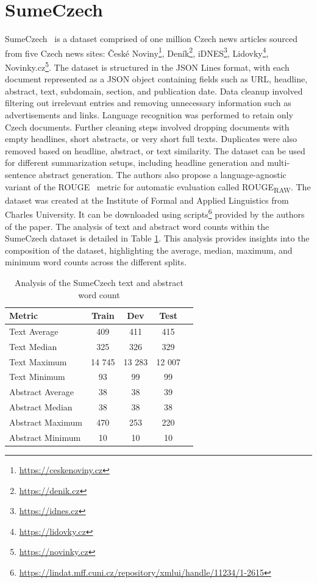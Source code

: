 \documentclass[english, ba, kiv, he, iso690numb, pdf, viewonly]{fasthesis}
\begin{document}
	\section{SumeCzech} \label{sumeczech-section}
	SumeCzech~\cite{straka-etal-2018-sumeczech} is a dataset comprised of one million Czech news articles sourced from five Czech news sites: České Noviny\footnote{\url{https://ceskenoviny.cz}}, Deník\footnote{\url{https://denik.cz}}, iDNES\footnote{\url{https://idnes.cz}}, Lidovky\footnote{\url{https://lidovky.cz}}, Novinky.cz\footnote{\url{https://novinky.cz}}. The dataset is structured in the JSON Lines format, with each document represented as a JSON object containing fields such as URL, headline, abstract, text, subdomain, section, and publication date. Data cleanup involved filtering out irrelevant entries and removing unnecessary information such as advertisements and links. Language recognition was performed to retain only Czech documents. Further cleaning steps involved dropping documents with empty headlines, short abstracts, or very short full texts. Duplicates were also removed based on headline, abstract, or text similarity. The dataset can be used for different summarization setups, including headline generation and multi-sentence abstract generation. The authors also propose a language-agnostic variant of the ROUGE~\cite{lin-2004-rouge} metric for automatic evaluation called ROUGE\textsubscript{RAW}. The dataset was created at the Institute of Formal and Applied Linguistics from Charles University. It can be downloaded using scripts\footnote{\url{https://lindat.mff.cuni.cz/repository/xmlui/handle/11234/1-2615}} provided by the authors of the paper. The analysis of text and abstract word counts within the SumeCzech dataset is detailed in Table \ref{tab:text_word_count_metrics}. This analysis provides insights into the composition of the dataset, highlighting the average, median, maximum, and minimum word counts across the different splits.
	
	\begin{table}[htbp]
		\centering
		\caption{Analysis of the SumeCzech text and abstract word count}
		\label{tab:text_word_count_metrics}
		\begin{tabular}{lcccc}
			\toprule
			\textbf{Metric} & {\textbf{Train}} & {\textbf{Dev}} & {\textbf{Test}} \\
			\midrule
			Text Average & 409 & 411 & 415 \\
			Text Median & 325 & 326 & 329 \\
			Text Maximum & 14 745 & 13 283 & 12 007 \\
			Text Minimum & 93 & 99 & 99 \\
			\midrule
			Abstract Average & 38 & 38 & 39 \\
			Abstract Median & 38 & 38 & 38 \\
			Abstract Maximum & 470 & 253 & 220 \\
			Abstract Minimum & 10 & 10 & 10 \\
			\bottomrule
		\end{tabular}
	\end{table}
	
\end{document}
